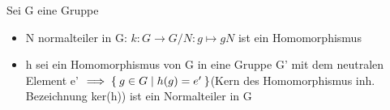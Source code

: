 \documentclass{../tudscript}
\begin{document}
Sei G eine Gruppe
\begin{itemize}
  \item N normalteiler in G: $k: G \rightarrow G/N: g \mapsto gN$ ist ein Homomorphismus
  \item h sei ein Homomorphismus von G in eine Gruppe G' mit dem neutralen Element e' $\implies \Set{g \in G \mid h(g) = e'}$(Kern des Homomorphismus inh. Bezeichnung ker(h)) ist ein Normalteiler in G
\end{itemize}
\end{document}
